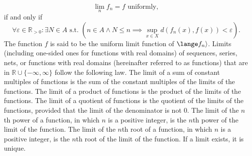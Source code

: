 \documentclass[a4paper,12pt]{report}
\begin{document}
\[\lim_nf_n=f\text{\ uniformly},\]
if and only if
\[\forall\varepsilon\in\mathbb{R}_{>0}\colon\exists N\in A\text{\ s.t.\ }\left(n\in A\land N\leq n\implies\sup_{x\in X}d(f_n(x),f(x))<\varepsilon\right).\]
The function $f$ is said to be the uniform limit function of $\lange f_n\rangle$.
Limits (including one-sided ones for functions with real domains) of sequences, series, nets, or functions with real domains (hereinafter referred to as functions) that are in $\mathbb{R}\cup\{-\infty,\infty\}$ follow the following law.
The limit of a sum of constant multiples of functions is the sum of the constant multiples of the limits of the functions.
The limit of a product of functions is the product of the limits of the functions.
The limit of a quotient of functions is the quotient of the limits of the functions, provided that the limit of the denominator is not 0.
The limit of the $n$th power of a function, in which $n$ is a positive integer, is the $n$th power of the limit of the function.
The limit of the $n$th root of a function, in which $n$ is a positive integer, is the $n$th root of the limit of the function.
If a limit exists, it is unique.
\end{document}
